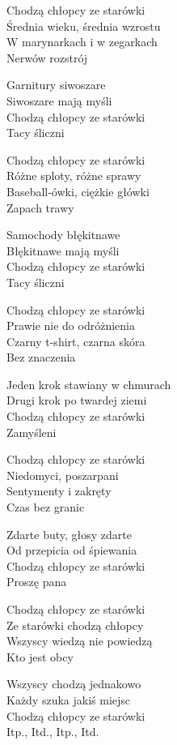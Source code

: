 
\begin{text}
    Chodzą chłopcy ze starówki\\
    Średnia wieku, średnia wzrostu\\
    W marynarkach i w zegarkach\\
    Nerwów rozstrój

    Garnitury siwoszare\\
    Siwoszare mają myśli\\
    Chodzą chłopcy ze starówki\\
    Tacy śliczni

    Chodzą chłopcy ze starówki\\
    Różne sploty, różne sprawy\\
    Baseball-ówki, ciężkie główki\\
    Zapach trawy

    Samochody błękitnawe\\
    Błękitnawe mają myśli\\
    Chodzą chłopcy ze starówki\\
    Tacy śliczni

    Chodzą chłopcy ze starówki\\
    Prawie nie do odróżnienia\\
    Czarny t-shirt, czarna skóra\\
    Bez znaczenia

    Jeden krok stawiany w chmurach\\
    Drugi krok po twardej ziemi\\
    Chodzą chłopcy ze starówki\\
    Zamyśleni

    Chodzą chłopcy ze starówki\\
    Niedomyci, poszarpani\\
    Sentymenty i zakręty\\
    Czas bez granic

    Zdarte buty, głosy zdarte\\
    Od przepicia od śpiewania\\
    Chodzą chłopcy ze starówki\\
    Proszę pana

    Chodzą chłopcy ze starówki\\
    Ze starówki chodzą chłopcy\\
    Wszyscy wiedzą nie powiedzą\\
    Kto jest obcy

    Wszyscy chodzą jednakowo\\
    Każdy szuka jakiś miejsc\\
    Chodzą chłopcy ze starówki\\
    Itp., Itd., Itp., Itd.
\end{text}
\begin{chord}

\end{chord}